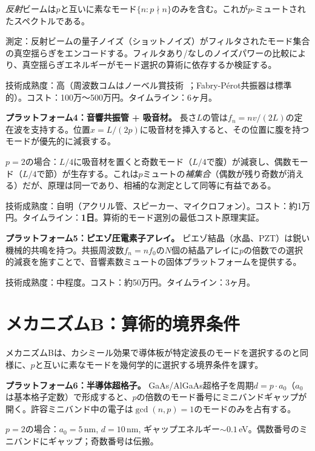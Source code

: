 \documentclass[11pt,a4paper]{article}
\begin{document}
\emph{反射}ビームは$p$と互いに素なモード$\{n : p\nmid n\}$のみを含む。これが$p$-ミュートされたスペクトルである。

測定：反射ビームの量子ノイズ（ショットノイズ）がフィルタされたモード集合の真空揺らぎをエンコードする。フィルタあり/なしのノイズパワーの比較により、真空揺らぎエネルギーがモード選択の算術に依存するか検証する。

技術成熟度：高（周波数コムはノーベル賞技術~\cite{Hansch2005}；Fabry-P\'{e}rot共振器は標準的）。コスト：100万〜500万円。タイムライン：6ヶ月。

\textbf{プラットフォーム4：音響共振管 + 吸音材。}
長さ$L$の管は$f_n = nv/(2L)$の定在波を支持する。位置$x = L/(2p)$に吸音材を挿入すると、その位置に腹を持つモードが優先的に減衰する。

$p = 2$の場合：$L/4$に吸音材を置くと奇数モード（$L/4$で腹）が減衰し、偶数モード（$L/4$で節）が生存する。これは$p$ミュートの\emph{補集合}（偶数が残り奇数が消える）だが、原理は同一であり、相補的な測定として同等に有益である。

技術成熟度：自明（アクリル管、スピーカー、マイクロフォン）。コスト：約1万円。タイムライン：\textbf{1日}。算術的モード選別の最低コスト原理実証。

\textbf{プラットフォーム5：ピエゾ圧電素子アレイ。}
ピエゾ結晶（水晶、PZT）は鋭い機械的共鳴を持つ。共振周波数$f_n = nf_0$の$N$個の結晶アレイに$p$の倍数での選択的減衰を施すことで、音響素数ミュートの固体プラットフォームを提供する。

技術成熟度：中程度。コスト：約50万円。タイムライン：3ヶ月。

\section{メカニズムB：算術的境界条件}
\label{sec:mech_b}

メカニズムBは、カシミール効果で導体板が特定波長のモードを選択するのと同様に、$p$と互いに素なモードを幾何学的に選択する境界条件を課す。

\textbf{プラットフォーム6：半導体超格子。}
GaAs/AlGaAs超格子を周期$d = p\cdot a_0$（$a_0$は基本格子定数）で形成すると、$p$の倍数のモード番号にミニバンドギャップが開く。許容ミニバンド中の電子は$\gcd(n,p) = 1$のモードのみを占有する。

$p = 2$の場合：$a_0 = 5$\,nm, $d = 10$\,nm, ギャップエネルギー$\sim 0.1$\,eV。偶数番号のミニバンドにギャップ；奇数番号は伝搬。
\end{document}
